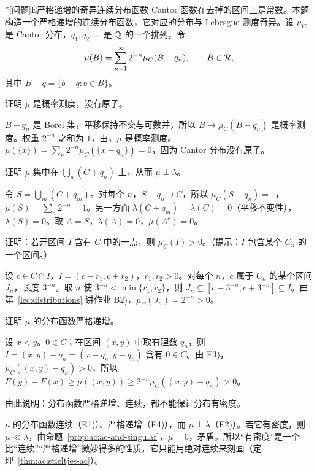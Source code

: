 \begin{probleme}*[问题]{E}{严格递增的奇异连续分布函数}
Cantor 函数在去掉的区间上是常数。本题构造一个严格递增的连续分布函数，它对应的分布与 Lebesgue 测度奇异。设 $\mu_C$ 是 Cantor 分布，$q_1,q_2,\dots$ 是 $\mathbb{Q}$ 的一个排列，令
\[
\mu(B)=\sum_{n=1}^\infty2^{-n}\mu_C(B-q_n),\qquad B\in\mathcal{R},
\]
其中 $B-q=\{b-q:b\in B\}$。
\begin{questions}
\item 证明 $\mu$ 是概率测度，没有原子。
\begin{solution}
$B-q_n$ 是 Borel 集，平移保持不交与可数并，所以 $B\mapsto\mu_C(B-q_n)$ 是概率测度。权重 $2^{-n}$ 之和为 $1$，由，$\mu$ 是概率测度。$\mu(\{x\})=\sum_n2^{-n}\mu_C(\{x-q_n\})=0$，因为 Cantor 分布没有原子。
\end{solution}
\item 证明 $\mu$ 集中在 $\bigcup_n(C+q_n)$ 上，从而 $\mu\perp\lambda$。
\begin{solution}
令 $S=\bigcup_m(C+q_m)$。对每个 $n$，$S-q_n\supseteq C$，所以 $\mu_C(S-q_n)=1$，$\mu(S)=\sum_n2^{-n}=1$。另一方面 $\lambda(C+q_m)=\lambda(C)=0$（平移不变性），$\lambda(S)=0$。取 $A=S$，$\lambda(A)=0$，$\mu(A^c)=0$。
\end{solution}
\item 证明：若开区间 $I$ 含有 $C$ 中的一点，则 $\mu_C(I)>0$。（提示：$I$ 包含某个 $C_n$ 的一个区间。）
\begin{solution}
设 $c\in C\cap I$，$I=(c-r_1,c+r_2)$，$r_1,r_2>0$。对每个 $n$，$c$ 属于 $C_n$ 的某个区间 $J_n$，长度 $3^{-n}$。取 $n$ 使 $3^{-n}<\min\{r_1,r_2\}$，则 $J_n\subseteq[c-3^{-n},c+3^{-n}]\subseteq I$。由第~\ref{lec:distributions} 讲作业 B2)，$\mu_C(J_n)=2^{-n}>0$。
\end{solution}
\item 证明 $\mu$ 的分布函数严格递增。
\begin{solution}
设 $x<y$。$0\in C$；在区间 $(x,y)$ 中取有理数 $q_n$，则 $I=(x,y)-q_n=(x-q_n,y-q_n)$ 含有 $0\in C$。由 E3)，$\mu_C((x,y)-q_n)>0$，所以 $F(y)-F(x)\geqslant\mu((x,y))\geqslant2^{-n}\mu_C((x,y)-q_n)>0$。
\end{solution}
\item 由此说明：分布函数严格递增、连续，都不能保证分布有密度。
\begin{solution}
$\mu$ 的分布函数连续（E1)）、严格递增（E4)），而 $\mu\perp\lambda$（E2)）。若它有密度，则 $\mu\ll\lambda$，由命题~\ref{prop:ac:ac-and-singular}，$\mu=0$，矛盾。所以“有密度”是一个比“连续”“严格递增”微妙得多的性质，它只能用绝对连续来刻画（定理~\ref{thm:ac:stieltjes-ac}）。
\end{solution}
\end{questions}
\end{probleme}

